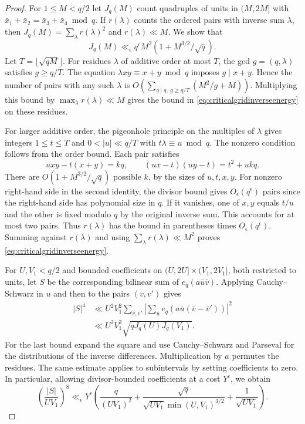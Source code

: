 \documentclass[11pt,a4paper]{article}
\numberwithin{equation}{section}
\begin{document}
\begin{proof}
For $1\le M<q/2$ let $J_q(M)$ count quadruples of
units in $(M,2M]$ with
$\bar x_1+\bar x_2=\bar x_3+\bar x_4\bmod q$.
If $r(\lambda)$ counts the ordered pairs with inverse
sum $\lambda$, then $J_q(M)=\sum_\lambda r(\lambda)^2$
and $r(\lambda)\ll M$. We show that
\begin{equation}
 J_q(M)\ll_\epsilon q^\epsilon M^2
                    (1+M^{3/2}/\sqrt q).
 \label{eq:criticalgridinverseenergy}
\end{equation}
Let $T=\lfloor\sqrt{q M}\rfloor$. For residues
$\lambda$ of additive order at most $T$, the gcd
$g=(q,\lambda)$ satisfies $g\ge q/T$.
The equation $\lambda xy\equiv x+y\bmod q$ imposes
$g\mid x+y$. Hence the number of pairs with any such
$\lambda$ is
$O(\sum_{g\mid q,\ g\ge q/T}(M^2/g+M))$.
Multiplying this bound by $\max_\lambda r(\lambda)\ll M$
gives the bound in \cref{eq:criticalgridinverseenergy}
on these residues.

For larger additive order, the pigeonhole principle
on the multiples of $\lambda$ gives integers
$1\le t\le T$ and $0<|u|\ll q/T$ with $t\lambda\equiv u\bmod q$.
The nonzero condition follows from the order bound.
Each pair satisfies
\[
 uxy-t(x+y)=kq,\qquad
 (ux-t)(uy-t)=t^2+ukq.
\]
There are $O(1+M^{3/2}/\sqrt q)$ possible $k$, by
the sizes of $u,t,x,y$. For nonzero right-hand side
in the second identity, the divisor bound gives
$O_\epsilon(q^\epsilon)$ pairs since the right-hand
side has polynomial size in $q$. If it vanishes,
one of $x,y$ equals $t/u$ and the other is fixed
modulo $q$ by the original inverse sum. This accounts
for at most two pairs. Thus $r(\lambda)$ has the
bound in parentheses times $O_\epsilon(q^\epsilon)$.
Summing against $r(\lambda)$ and using
$\sum_\lambda r(\lambda)\ll M^2$ proves
\cref{eq:criticalgridinverseenergy}.

For $U,V_1<q/2$ and bounded coefficients on
$(U,2U]\times(V_1,2V_1]$, both restricted to units,
let $S$ be the corresponding bilinear sum of
$e_q(a\bar u\bar v)$. Applying Cauchy--Schwarz
in $u$ and then to the pairs $(v,v')$ gives
\begin{align*}
 |S|^4
 &\ll U^2 V_1^2
   \sum_{v,v'}\left|\sum_u e_q(a\bar u(\bar v-\bar v'))\right|^2\\
 &\ll U^2 V_1^2\sqrt{q J_q(U) J_q(V_1)} .
\end{align*}
For the last bound expand the square and use
Cauchy--Schwarz and Parseval for the distributions
of the inverse differences. Multiplication by
$a$ permutes the residues. The same estimate
applies to subintervals by setting coefficients
to zero. In particular, allowing divisor-bounded
coefficients at a cost $Y^\epsilon$, we obtain
\begin{equation}
 \left(\frac{|S|}{UV_1}\right)^8
 \ll_\epsilon Y^\epsilon\left(
     \frac{q}{(UV_1)^2}
     +\frac{\sqrt q}{\sqrt{UV_1}\min(U,V_1)^{3/2}}
     +\frac1{\sqrt{UV_1}}\right).
 \label{eq:criticalgridinversebilinear}
\end{equation}


\end{proof}
\end{document}
